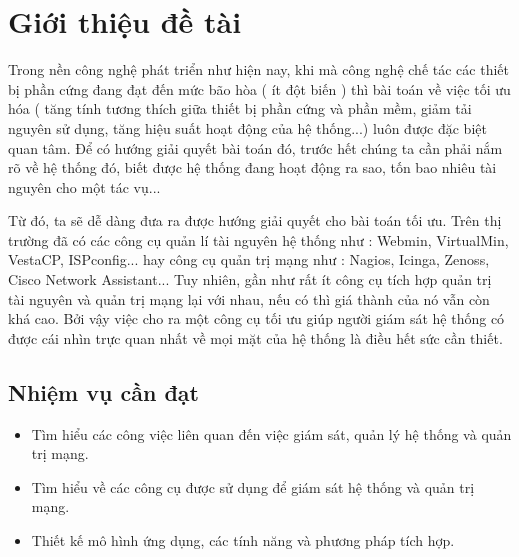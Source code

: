 \chapter{Giới thiệu đề tài}
\pagestyle{fancy}
Trong nền công nghệ phát triển như hiện nay, khi mà công nghệ chế tác các thiết
bị phần cứng đang đạt đến mức bão hòa ( ít đột biến ) thì bài toán về việc tối
ưu hóa ( tăng tính tương thích giữa thiết bị phần cứng và phần mềm, giảm tải
nguyên sử dụng, tăng hiệu suất hoạt động của hệ thống...) luôn được đặc biệt quan tâm. Để có hướng giải quyết bài
toán đó, trước hết chúng ta cần phải nắm rõ về hệ thống đó, biết được hệ thống
đang hoạt động ra sao, tốn bao nhiêu tài nguyên cho một tác vụ...

Từ đó, ta sẽ dễ dàng đưa ra được hướng giải quyết cho bài toán tối ưu. Trên thị
trường đã có các công cụ quản lí tài nguyên hệ thống như : Webmin, VirtualMin,
VestaCP, ISPconfig... hay công cụ quản trị mạng như : Nagios, Icinga, Zenoss,
Cisco Network Assistant... Tuy nhiên, gần như rất ít công cụ tích hợp quản trị tài nguyên và quản trị mạng lại với nhau, nếu có thì giá thành của nó vẫn còn khá cao. Bởi vậy việc cho ra một công cụ tối ưu giúp người giám sát hệ thống có được cái nhìn trực quan nhất về mọi mặt của hệ thống là điều hết sức cần thiết.

    \section{Nhiệm vụ cần đạt}
    \begin{itemize}
        \item Tìm hiểu các công việc liên quan đến việc giám sát, quản lý hệ thống và quản trị mạng.
        \item Tìm hiểu về các công cụ được sử dụng để giám sát hệ thống và quản trị mạng.
        \item Thiết kế mô hình ứng dụng, các tính năng và phương pháp tích hợp.
    \end{itemize}
   